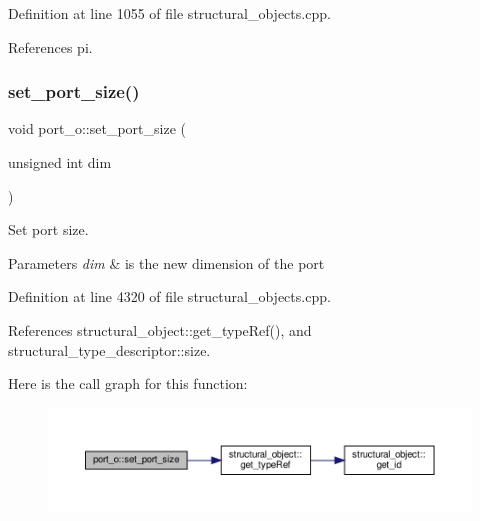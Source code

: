 Definition at line 1055 of file structural\+\_\+objects.\+cpp.



References pi.

\mbox{\label{structport__o_a4f8462c05383622e041c2af643ddedf7}} 
\subsubsection{\texorpdfstring{set\+\_\+port\+\_\+size()}{set\_port\_size()}}
{\footnotesize\ttfamily void port\+\_\+o\+::set\+\_\+port\+\_\+size (\begin{DoxyParamCaption}\item[{unsigned int}]{dim }\end{DoxyParamCaption})}



Set port size. 


\begin{DoxyParams}{Parameters}
{\em dim} & is the new dimension of the port \\
\hline
\end{DoxyParams}


Definition at line 4320 of file structural\+\_\+objects.\+cpp.



References structural\+\_\+object\+::get\+\_\+type\+Ref(), and structural\+\_\+type\+\_\+descriptor\+::size.

Here is the call graph for this function\+:
\nopagebreak
\begin{figure}[H]
\begin{center}
\leavevmode
\includegraphics[width=350pt]{df/d75/structport__o_a4f8462c05383622e041c2af643ddedf7_cgraph}
\end{center}
\end{figure}
\mbox{\label{structport__o_a278864c3e3b7fd9b6821e7d8346d8209}} 
